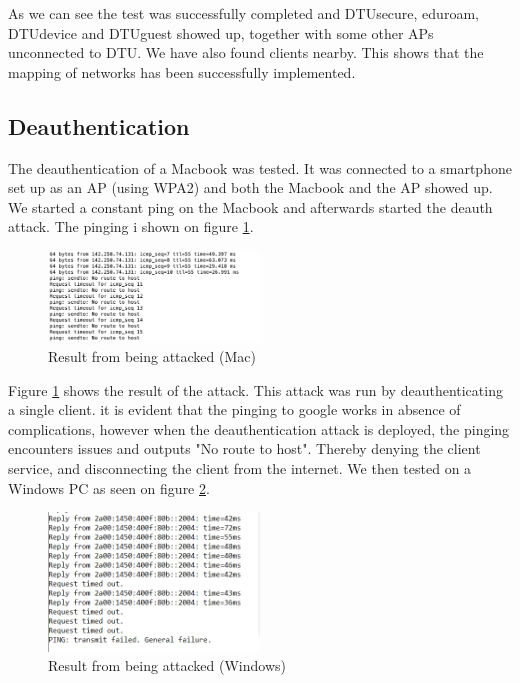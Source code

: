 As we can see the test was successfully completed and DTUsecure, eduroam, DTUdevice and DTUguest showed up, together with some other APs unconnected to DTU. We have also found clients nearby. This shows that the mapping of networks has been successfully implemented.


\subsection{Deauthentication}

The deauthentication of a Macbook was tested. It was connected to a smartphone set up as an AP (using WPA2) and both the Macbook and the AP showed up. We started a constant ping on the Macbook and afterwards started the deauth attack. The pinging i shown on figure \ref{Test2}.

\begin{figure}[!htbp]
     \centering
     \includegraphics[width=0.5\textwidth]{Latex-Files/Billeder/Tests/deauth_ping.png}
     \caption{Result from being attacked (Mac)}
     \label{Test2}
\end{figure}

Figure \ref{Test2} shows the result of the attack. This attack was run by deauthenticating a single client. it is evident that the pinging to google works in absence of complications, however when the deauthentication attack is deployed, the pinging encounters issues and outputs "No route to host". Thereby denying the client service, and disconnecting the client from the internet. We then tested on a Windows PC as seen on figure \ref{Test3}.

\begin{figure}[!htbp]
    \centering
    \includegraphics[width=0.5\textwidth]{Latex-Files/Billeder/Tests/Deauth virker.png}
    \caption{Result from being attacked (Windows)}
    \label{Test3}
\end{figure}

